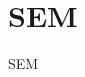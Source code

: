 \documentclass[\main/dresen_thesis.tex]{subfiles}
\begin{document}
  \section{SEM}
    \label{app:methods:sem}
    SEM
\end{document}
